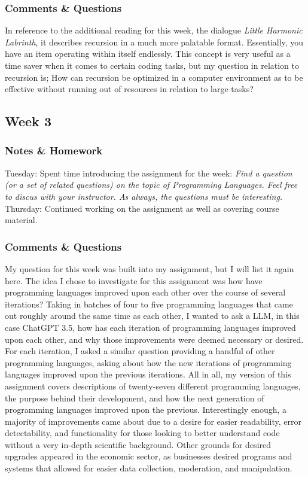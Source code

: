 \documentclass{article}
\theoremstyle{theorem}
\theoremstyle{definition}
\theoremstyle{remark}
\begin{document}
  \subsubsection{Comments \& Questions}
    In reference to the additional reading for this week, the dialogue \textit{Little Harmonic Labrinth}, it describes recursion in a much more palatable format. Essentially, you have an item operating within itself endlessly. This concept is very useful as a time saver when it comes to certain coding tasks, but my question in relation to recursion is; How can recursion be optimized in a computer environment as to be effective without running out of resources in relation to large tasks? 

  \subsection{Week 3}

  \subsubsection{Notes \& Homework}
    Tuesday: Spent time introducing the assignment for the week: \textit{Find a question (or a set of related questions) on the topic of Programming Languages. Feel free to discus with your instructor. As always, the questions must be interesting.}
    Thursday: Continued working on the assignment as well as covering course material. 

  \subsubsection{Comments \& Questions}
    My question for this week was built into my assignment, but I will list it again here. The idea I chose to investigate for this assignment was how have programming languages improved upon each other over the course of several iterations? Taking in batches of four to five programming languages that came out roughly around the same time as each other, I wanted to ask a LLM, in this case ChatGPT 3.5, how has each iteration of programming languages improved upon each other, and why those improvements were deemed necessary or desired. For each iteration, I asked a similar question providing a handful of other programming languages, asking about how the new iterations of programming languages improved upon the previous iterations. All in all, my version of this assignment covers descriptions of twenty-seven different programming languages, the purpose behind their development, and how the next generation of programming languages improved upon the previous. Interestingly enough, a majority of improvements came about due to a desire for easier readability, error detectability, and functionality for those looking to better understand code without a very in-depth scientific background. Other grounds for desired upgrades appeared in the economic sector, as businesses desired programs and systems that allowed for easier data collection, moderation, and manipulation.
\end{document}
